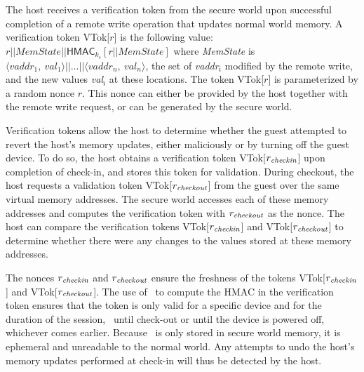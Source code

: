 The host receives a verification token from the secure world upon successful
completion of a remote write operation that updates normal world memory. 
A verification token \textsf{VTok}[$r$] is the following value:
%
%
$
r||\textit{MemState}||\textsf{HMAC}_{k_s}[r||\textit{MemState}]$
%
%
where \textit{MemState} is
$\langle\textit{vaddr}_1,~\textit{val}_1\rangle||\ldots||\langle\textit{vaddr}_n,~\textit{val}_n\rangle$,
the set of \textit{vaddr}$_i$ modified by the remote write, and the new values
\textit{val}$_i$ at these locations. The token \textsf{VTok}[$r$] is
parameterized by a random nonce $r$. This nonce can either be provided by the
host together with the remote write request, or can be generated by the secure
world. 

Verification tokens allow the host to determine whether the guest attempted to
revert the host's memory updates, either maliciously or by turning off the
guest device. To do so, the host obtains a verification token
\textsf{VTok}[$r_{{\it checkin}}$] upon completion of check-in, and stores this
token for validation. During checkout, the host requests a validation token
\textsf{VTok}[$r_{\it checkout}$] from the guest over the same virtual memory
addresses. The secure world accesses each of these memory addresses and
computes the verification token with $r_{\it checkout}$ as the nonce. The host
can compare the verification tokens \textsf{VTok}[$r_{{\it checkin}}$] and
\textsf{VTok}[$r_{{\it checkout}}$] to determine whether there were any changes
to the values stored at these memory addresses. 

The nonces $r_{\it checkin}$ and $r_{\it checkout}$ ensure the freshness of
the tokens
\textsf{VTok}[$r_{{\it checkin}}$] and \textsf{VTok}[$r_{{\it checkout}}$].
The use of \ks\ to compute the HMAC in the verification token ensures that the
token is only valid for a specific device and for the duration of the session,
\ie~until check-out or until the device is powered off, whichever comes
earlier. Because \ks\ is only stored in secure world memory, it is ephemeral
and unreadable to the normal world. Any attempts to undo the host's memory
updates performed at check-in will thus be detected by the host.


